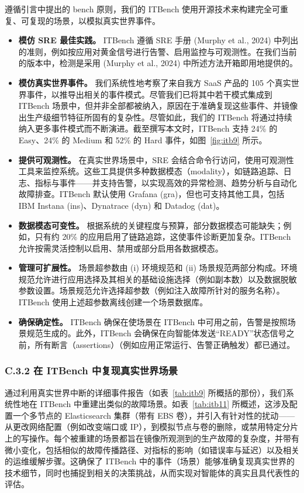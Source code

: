 遵循引言中提出的 bench 原则，我们的 ITBench 使用开源技术来构建完全可重复、可复现的场景，以模拟真实世界事件。

\begin{itemize}
\item \textbf{模仿 SRE 最佳实践。} ITBench 遵循 SRE 手册 (Murphy et al., 2024) 中列出的准则，例如按应用对黄金信号进行告警、启用监控与可观测性。在我们当前的版本中，检测是采用 (Murphy et al., 2024) 中所述方法开箱即用地提供的。
\item \textbf{模仿真实世界事件。} 我们系统性地考察了来自我方 SaaS 产品的 105 个真实世界事件，以推导出相关的事件模式。尽管我们已将其中若干模式集成到 ITBench 场景中，但并非全部都被纳入，原因在于准确复现这些事件、并镜像出生产级细节特征所固有的复杂性。尽管如此，我们的 ITBench 将通过持续纳入更多事件模式而不断演进。截至撰写本文时，ITBench 支持 24\% 的 Easy、24\% 的 Medium 和 52\% 的 Hard 事件，如图~\ref{fig:itb9} 所示。
\item \textbf{提供可观测性。} 在真实世界场景中，SRE 会结合命令行访问，使用可观测性工具来监控系统。这些工具提供多种数据模态（modality），如链路追踪、日志、指标与事件——并支持告警，以实现高效的异常检测、趋势分析与自动化故障排查。ITBench 默认使用 Grafana (gra)，但也可支持其他工具，包括 IBM Instana (ins)、Dynatrace (dyn) 和 Datadog (dat)。
\item \textbf{数据模态可变性。} 根据系统的关键程度与预算，部分数据模态可能缺失；例如，只有约 20\% 的应用启用了链路追踪，这使事件诊断更加复杂。ITBench 允许按需灵活控制以启用、禁用或部分启用各数据模态。
\item \textbf{管理可扩展性。} 场景超参数由 (i) 环境规范和 (ii) 场景规范两部分构成。环境规范允许进行应用选择及其相关的基础设施选择（例如副本数）以及数据脱敏参数设置。场景规范允许选择超参数（例如注入故障所针对的服务名称）。ITBench 使用上述超参数离线创建一个场景数据库。
\item \textbf{确保确定性。} ITBench 确保在使场景在 ITBench 中可用之前，告警是按照场景规范生成的。此外，ITBench 会确保在向智能体发送“READY”状态信号之前，所有断言（assertions）（例如应用正常运行、告警正确触发）都已通过。
\end{itemize}

\subsubsection{C.3.2 在 ITBench 中复现真实世界场景}

通过利用真实世界中断的详细事件报告（如表~\ref{tab:itb9} 所概括的那份），我们系统性地在 ITBench 中重建出类似的故障场景。如表~\ref{tab:itb11} 所概述，这涉及配置一个多节点的 Elasticsearch 集群（带有 EBS 卷），并引入有针对性的扰动——从更改网络配置（例如改变端口或 IP），到模拟节点与卷的删除，或禁用特定分片上的写操作。每个被重建的场景都旨在镜像所观测到的生产故障的复杂度，并带有微小变化，包括相似的故障传播路径、对指标的影响（如错误率与延迟）以及相关的运维缓解步骤。这确保了 ITBench 中的事件（场景）能够准确复现真实世界的技术细节，同时也捕捉到相关的决策挑战，从而实现对智能体的真实且具代表性的评估。


